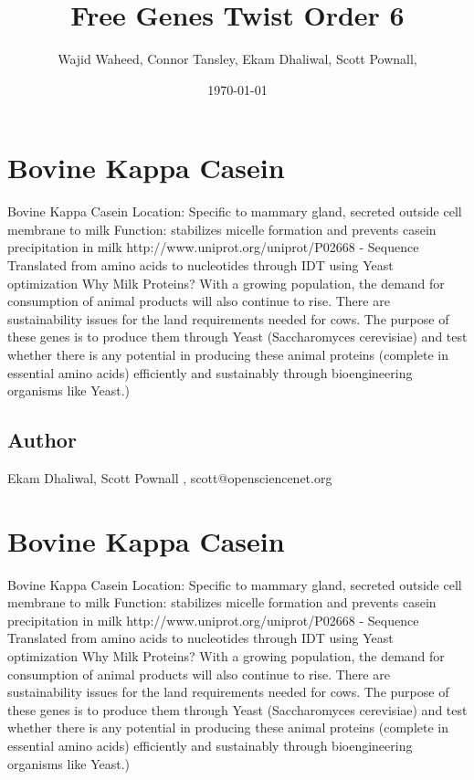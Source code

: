 \documentclass{article}%
\title{Free Genes Twist Order 6}%
\author{Wajid Waheed, Connor Tansley, Ekam Dhaliwal, Scott Pownall, }%
\date{\today}%
\begin{document}
%
\normalsize%
\maketitle%
\section{Bovine Kappa Casein}%
Bovine Kappa Casein  \newline%
Location: Specific to mammary gland, secreted outside cell membrane to milk\newline%
Function: stabilizes micelle formation and prevents casein precipitation in milk \newline%
http://www.uniprot.org/uniprot/P02668\newline%
{-} Sequence Translated from amino acids to nucleotides through IDT using Yeast optimization \newline%
Why Milk Proteins? With a growing population, the demand for consumption of animal products will also continue to rise. There are sustainability issues for the land requirements needed for cows. The purpose of these genes is to produce them through Yeast (Saccharomyces cerevisiae) and test whether there is any potential in producing these animal proteins (complete in essential amino acids) efficiently and sustainably through bioengineering organisms like Yeast.) %
\subsection{Author}%
Ekam Dhaliwal, Scott Pownall%
,%
scott@opensciencenet.org

%
\section{Bovine Kappa Casein}%
Bovine Kappa Casein  \newline%
Location: Specific to mammary gland, secreted outside cell membrane to milk\newline%
Function: stabilizes micelle formation and prevents casein precipitation in milk \newline%
http://www.uniprot.org/uniprot/P02668\newline%
{-} Sequence Translated from amino acids to nucleotides through IDT using Yeast optimization \newline%
Why Milk Proteins? With a growing population, the demand for consumption of animal products will also continue to rise. There are sustainability issues for the land requirements needed for cows. The purpose of these genes is to produce them through Yeast (Saccharomyces cerevisiae) and test whether there is any potential in producing these animal proteins (complete in essential amino acids) efficiently and sustainably through bioengineering organisms like Yeast.) %
\end{document}
